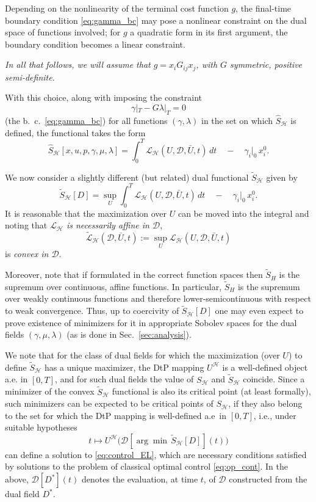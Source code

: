 \documentclass[11pt]{article}
\newcommand{\dee}{\mathcal{D}}
\newcommand{\scl}{\mathcal{L}}
\newcommand{\sch}{\mathcal{H}}
\begin{document}
Depending on the nonlinearity of the terminal cost function $g$, the final-time boundary condition \eqref{eq:gamma_bc} may pose a nonlinear constraint on the dual space of functions involved; for $g$ a quadratic form in its first argument, the boundary condition becomes a linear constraint.

\emph{In all that follows, we will assume that $g = x_i G_{ij} x_j$, with $G$ symmetric, positive semi-definite}.

With this choice, along with imposing the constraint 
\begin{equation}\label{eq:linear_dual_bc}
\gamma|_T - G \lambda|_T = 0
\end{equation}
(the b.~c.~\eqref{eq:gamma_bc}) for all functions $(\gamma, \lambda)$ in the set on which $\widehat{S}_\sch$ is defined, the functional takes the form
\[
\widehat{S}_\sch[x,u,p, \gamma, \mu, \lambda] = \int_0^T \scl_\sch(U,\dee, \bar{U}, t) \,dt \quad - \quad \gamma_i|_0 \, x^0_i.
\]

We now consider a slightly different (but related) dual functional $\tilde{S}_\sch$ given by
\begin{equation}
    \tilde{S}_\sch[D] = \sup_U \int_0^T \scl_\sch (U,\dee, \bar{U}, t) \,dt \quad - \quad \gamma_i|_0 \, x^0_i.
\end{equation}
It is reasonable that the maximization over $U$ can be moved into the integral and noting that \emph{ $\scl_\sch$ is necessarily affine in $\dee$},
\[
\tilde{\scl}_\sch (\dee, \bar{U}, t) := \sup_U \scl_\sch (U,\dee, \bar{U}, t)
\]
is \emph{convex in $\dee$}.

Moreover, note that if formulated in the correct function spaces then $\tilde{S}_H$ is the supremum over continuous, affine functions. In particular, $\tilde{S}_H$ is the supremum over weakly continuous functions and therefore lower-semicontinuous with respect to weak convergence. Thus, up to coercivity of $\tilde{S}_\sch[D]$ one may even expect to prove existence of minimizers for it in appropriate Sobolev spaces for the dual fields $(\gamma, \mu, \lambda)$ (as is done in Sec.~\ref{sec:analysis}). 

We note that for the class of dual fields for which the maximization (over $U$) to define $\tilde{S}_\sch$ has a unique maximizer, the DtP mapping $U^\sch$ is a well-defined object a.e. in $[0,T]$, and for such dual fields the value of $S_\sch$ and $\tilde{S}_\sch$ coincide. Since a minimizer of the convex $\tilde{S}_\sch$ functional is also its critical point (at least formally), such minimizers can be expected to be critical points of $S_\sch$, if they also belong to the set for which the DtP mapping is well-defined a.e~in $[0,T]$, i.e., under suitable hypotheses
\[
t \mapsto U^\sch\big(\dee[{\arg\!\min} \, \tilde{S}_\sch[D]](t)\big)
\]
can define a solution to \eqref{eq:control_EL}, which are necessary conditions satisfied by solutions to the problem of classical optimal control \eqref{eq:op_cont}. In the above, $\dee[D^*](t)$ denotes the evaluation, at time $t$, of $\dee$ constructed from the dual field $D^*$.
\end{document}
